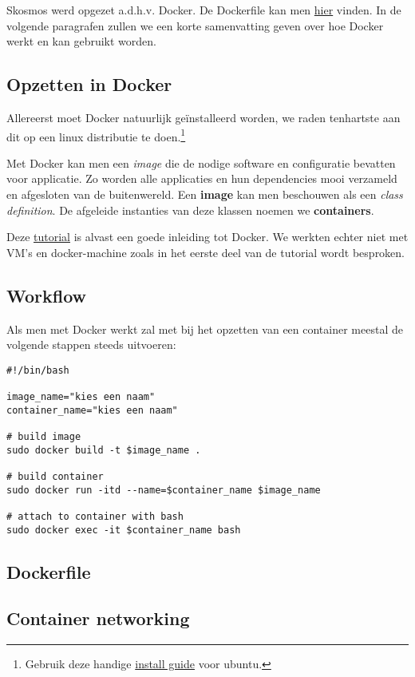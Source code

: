 Skosmos werd opgezet a.d.h.v. Docker. De Dockerfile kan men \href{https://github.com/lab9k/Skos/blob/master/Dockerfile}{hier} vinden. In de volgende paragrafen zullen we een korte samenvatting geven over hoe Docker werkt en kan gebruikt worden.

\subsection{Opzetten in Docker}
Allereerst moet Docker natuurlijk geïnstalleerd worden, we raden tenhartste aan dit op een linux distributie te doen.\footnote{Gebruik deze handige  \href{https://docs.docker.com/install/linux/docker-ce/ubuntu/}{install guide} voor ubuntu.}

Met Docker kan men een \textit{image} die de nodige software en configuratie bevatten voor applicatie. Zo worden alle applicaties en hun dependencies mooi verzameld en afgesloten van de buitenwereld. Een \textbf{image} kan men beschouwen als een \textit{class definition}. De afgeleide instanties van deze klassen noemen we \textbf{containers}.

Deze \href{https://semaphoreci.com/community/tutorials/dockerizing-a-php-application}{tutorial} is alvast een goede inleiding tot Docker. We werkten echter niet met VM's en docker-machine zoals in het eerste deel van de tutorial wordt besproken. 

\subsection{Workflow}
Als men met Docker werkt zal met bij het opzetten van een container meestal de volgende stappen steeds uitvoeren:



\begin{verbatim}
#!/bin/bash

image_name="kies een naam"
container_name="kies een naam"

# build image
sudo docker build -t $image_name .

# build container
sudo docker run -itd --name=$container_name $image_name

# attach to container with bash
sudo docker exec -it $container_name bash

\end{verbatim}

\subsection{Dockerfile}


\subsection{Container networking}
